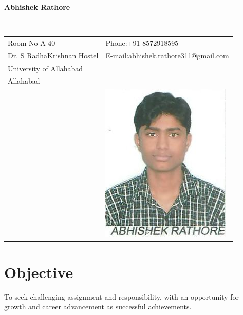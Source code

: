 \documentclass[12pt]{article}
\begin{document}
\vspace{0.5in}
\begin{center}\begin{large}\textbf{Abhishek Rathore}\end{large}\end{center}\textbf{\hrulefill}\\

\begin{tabular}{@{}p{4in}p{3in}}
Room No-A 40 & {Phone:}+91-8572918595 \\
Dr. S RadhaKrishnan Hostel & {E-mail:}abhishek.rathore311@gmail.com\\
University of Allahabad \\
Allahabad\\
& \includegraphics[scale=0.8]{Abhishek_Rathore_Photo.jpg}\\
\end{tabular}

\section*{Objective}
To seek challenging assignment and responsibility, with an opportunity for growth and career advancement as successful achievements.
\end{document}
